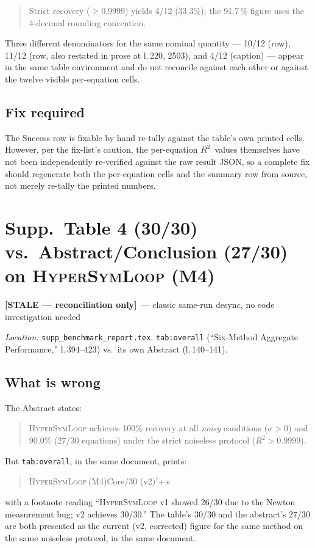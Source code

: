 \documentclass[11pt]{article}
\newcommand{\rtwo}{$R^2$}
\newcommand{\Rsq}{R^{2}}
\newcommand{\HSL}{\textsc{HyperSymLoop}}
\newcommand{\stale}{\textcolor{orange!80!black}{\textbf{[STALE --- reconciliation only]}}}
\newcommand{\loc}[1]{\textit{Location:} #1\par}
\newenvironment{evidence}
  {\begin{quote}\small\ttfamily}
  {\end{quote}}
\begin{document}
\begin{evidence}
Strict recovery ($\ge 0.9999$) yields 4/12 (33.3\%); the 91.7\,\% figure uses
the 4-decimal rounding convention.
\end{evidence}

Three different denominators for the same nominal quantity --- 10/12 (row),
11/12 (row, also restated in prose at l.\,220, 2503), and 4/12 (caption) ---
appear in the same table environment and do not reconcile against each other
or against the twelve visible per-equation cells.

\subsection*{Fix required}
The Success row is fixable by hand re-tally against the table's own printed
cells. However, per the fix-list's caution, the per-equation \rtwo\ values
themselves have not been independently re-verified against the raw result
JSON, so a complete fix should regenerate both the per-equation cells and
the summary row from source, not merely re-tally the printed numbers.

\section{Supp.\ Table 4 (30/30) vs.\ Abstract/Conclusion (27/30) on \HSL{} (M4)}
\label{issue:2}
\stale\ --- classic same-run desync, no code investigation needed

\loc{\texttt{supp\_benchmark\_report.tex}, \texttt{tab:overall}
(``Six-Method Aggregate Performance,'' l.\,394--423) vs.\ its own Abstract
(l.\,140--141).}

\subsection*{What is wrong}
The Abstract states:
\begin{evidence}
\HSL{} achieves 100\% recovery at all \emph{noisy} conditions ($\sigma > 0$)
and 90.0\% (27/30 equations) under the strict noiseless protocol
($\Rsq > 0.9999$).
\end{evidence}
But \texttt{tab:overall}, in the same document, prints:
\begin{evidence}
\HSL\,(M4)\quad Core/30 (v2)$^\dagger$+\,s
\end{evidence}
with a footnote reading ``\HSL{} v1 showed 26/30 due to the Newton
measurement bug; v2 achieves 30/30.'' The table's 30/30 and the abstract's
27/30 are both presented as the current (v2, corrected) figure for the same
method on the same noiseless protocol, in the same document.
\end{document}
